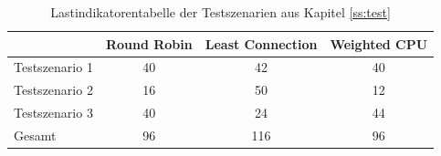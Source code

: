 \begin{table}[h!]
\centering
\renewcommand{\arraystretch}{1.5}
\begin{tabular}{|l|c|c|c|}
    \hline
    & Round Robin & Least Connection & Weighted CPU \\
    \hline
    Testszenario 1 & 40 & 42 & 40 \\
    \hline
    Testszenario 2 & 16 & 50 & 12 \\
    \hline
    Testszenario 3 & 40 & 24 & 44 \\
    \hline
    \hline
    Gesamt & 96 & 116 & 96 \\
    \hline
\end{tabular}
\caption{Lastindikatorentabelle der Testszenarien aus Kapitel \ref{ss:test}}
\label{table:test-output}
\end{table}

